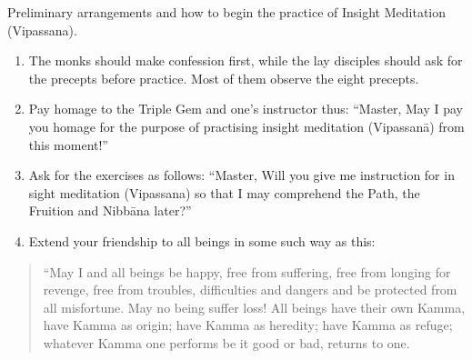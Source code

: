 \documentclass[a5paper,10pt,english]{book}
\begin{document}
\sphinxAtStartPar
Preliminary arrangements and how to begin the practice of Insight Meditation (Vipassana).
\begin{enumerate}
%
\item {} 
\sphinxAtStartPar
The monks should make confession first, while the lay disciples should ask for the precepts before practice. Most of them observe the eight precepts.

\item {} 
\sphinxAtStartPar
Pay homage to the Triple Gem and one’s instructor thus:  “Master, May I pay you homage for the purpose of practising insight meditation (Vipassanā) from this moment!”

\item {} 
\sphinxAtStartPar
Ask for the exercises as follows:  “Master, Will you give me instruction for in sight meditation (Vipassana) so that I may comprehend the Path, the Fruition and Nibbāna later?”

\item {} 
\sphinxAtStartPar
Extend your friendship to all beings in some such way as this:

\end{enumerate}
\begin{quote}

\sphinxAtStartPar
“May I and all beings be happy, free from suffering, free from longing for revenge, free from troubles, difficulties and dangers and be protected from all misfortune. May no being suffer loss! All beings have their own Kamma, have Kamma as origin; have Kamma as heredity; have Kamma as refuge; whatever Kamma one performs be it good or bad, returns to one.
\end{quote}
\end{document}
